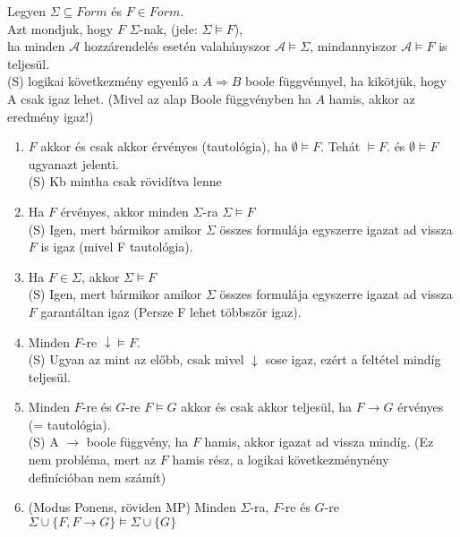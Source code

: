 \begin{frame}
\begin{tcolorbox}[title={Def.: Logikai következmény}]
Legyen $\Sigma \subseteq Form$ és $F \in Form$.\\
Azt mondjuk, hogy $F$ \underline{} $\Sigma$-nak, (jele: $\Sigma \models F$),\\
ha minden $\mathcal{A}$ hozzárendelés esetén valahányszor $\mathcal{A} \models \Sigma$, mindannyiszor $\mathcal{A} \models F$ is teljesül.\\
{\tiny (S) logikai következmény egyenlő a $A \Rightarrow B$ boole függvénnyel, ha kikötjük, hogy A csak igaz lehet. (Mivel az alap Boole függvényben ha $A$ hamis, akkor az eredmény igaz!)}
\end{tcolorbox}
\mmedskip
\begin{tcolorbox}[title={Ész}]
\begin{enumerate}
\item $F$ akkor és csak akkor érvényes (tautológia), ha $\emptyset \models F$. Tehát $\models F$. és $\emptyset \models F$ ugyanazt jelenti.\\
{\tiny (S) Kb mintha csak rövidítva lenne}\\
\item Ha $F$ érvényes, akkor minden $\Sigma$-ra $\Sigma \models F$\\
{\tiny (S) Igen, mert bármikor amikor $\Sigma$ összes formulája egyszerre igazat ad vissza $F$ is igaz (mivel F tautológia).}\\
\item Ha $F \in \Sigma$, akkor $\Sigma \models F$\\
{\tiny (S) Igen, mert bármikor amikor $\Sigma$ összes formulája egyszerre igazat ad vissza $F$ garantáltan igaz (Persze F lehet többször igaz).}\\
\item Minden $F$-re $\downarrow \models F$.\\
{\tiny (S) Ugyan az mint az előbb, csak mivel $\downarrow$ sose igaz, ezért a feltétel mindíg teljesül.}\\
\item Minden $F$-re és $G$-re $F \models G$ akkor és csak akkor teljesül, ha $F \rightarrow G$ érvényes (= tautológia).\\
{\tiny (S) A $\rightarrow$ boole függvény, ha $F$ hamis, akkor igazat ad vissza mindíg. (Ez nem probléma, mert az $F$ hamis rész, a logikai következménynény definícióban nem számít)}\\
\item (Modus Ponens, röviden MP) Minden $\Sigma$-ra, $F$-re és $G$-re $\Sigma \cup \{F, F \rightarrow G\} \models \Sigma \cup \{G\}$\\

\end{enumerate}
\end{tcolorbox}
\end{frame}
